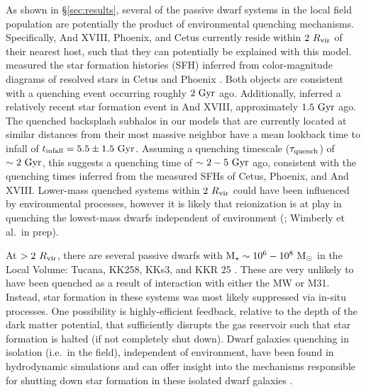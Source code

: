 As shown in \S\ref{sec:results}, several of the passive dwarf systems in the
local field population are potentially the product of environmental quenching
mechanisms. 
Specifically, And XVIII, Phoenix, and Cetus currently reside within
$2~R_{\rm{vir}}$ of their nearest host, such that they can potentially be
explained with this model. 
%
\citet{weisz14a} measured the star formation histories (SFH) inferred
from color-magnitude diagrams of resolved stars in Cetus and Phoenix
\citep[see also][]{hidalgo,monelli10a,monelli10b,monelli12}. 
Both objects are consistent with a quenching event occurring roughly
$2~{\rm Gyr}$ ago. 
Additionally, \citet{makarova17} inferred a relatively recent star
formation event in And XVIII, approximately $1.5~{\rm Gyr}$ ago.
%
The quenched backsplash subhalos in our models that are currently located at
similar distances from their most massive neighbor have a mean lookback time to
infall of $t_{\rm infall} = 5.5 \pm 1.5~{\rm Gyr}$. Assuming a quenching
timescale ($\tau_{\rm quench}$) of $\sim 2~{\rm Gyr}$, this suggests a quenching
time of $\sim 2-5~{\rm Gyr}$ ago, consistent with the quenching times inferred
from the measured SFHs of Cetus, Phoenix, and And XVIII.
%
Lower-mass quenched systems within $2~R_{\rm{vir}}$ \citep[e.g.~Eri~II,][]{DES15,
  koposov15} could have been influenced by environmental processes, however it is
likely that reionization is at play in quenching the lowest-mass dwarfs
independent of environment (\citealt{brown14}; Wimberly et al.~in prep).





At $>2~R_{\rm{vir}}$, there are several passive dwarfs with
${\rm M}_{\star} \sim 10^{6}-10^{8}~{\rm M}_{\odot}$ in the Local Volume: Tucana, KK258, KKs3, and
KKR 25 \citep{lavery92, makarov12, weisz14a, karachentsev14b, karachentsev15b,
  karachentsev15a}. These are very unlikely to have been quenched as a result of
interaction with either the MW or M31. Instead, star formation in these systems
was most likely suppressed via in-situ processes. One possibility is
highly-efficient feedback, relative to the depth of the dark matter potential,
that sufficiently disrupts the gas reservoir such that star formation is halted
(if not completely shut down). 
%
 Dwarf galaxies quenching in isolation (i.e.~in the field),
 independent of environment, have been found in hydrodynamic
 simulations and can offer insight into the mechanisms responsible for
 shutting down star formation in these isolated dwarf galaxies
 \citep[e.g.][]{fitts17}.  




